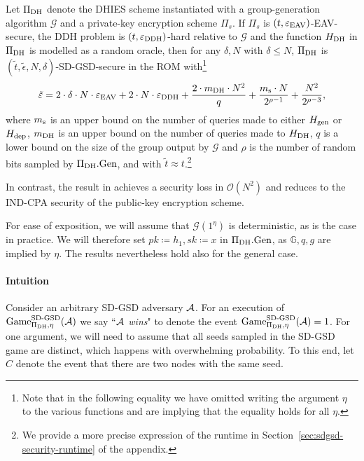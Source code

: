 \begin{theorem} \label{theorem:sdgsd-security}
	Let $\Pi_{\mathrm{DH}}$ denote the DHIES scheme instantiated with a group-generation algorithm $\mathcal{G}$ and a private-key encryption scheme $\Pi_s$. If $\Pi_s$ is $(t, \varepsilon_\mathrm{EAV})$-EAV-secure, the DDH problem is $(t, \varepsilon_\mathrm{DDH})$-hard relative to $\mathcal{G}$ and the function $H_\mathrm{DH}$ in $\Pi_{\mathrm{DH}}$ is modelled as a random oracle, then for any $\delta, N$ with $\delta \le N$, $\Pi_{\mathrm{DH}}$ is $(\tilde{t}, \tilde{\epsilon}, N, \delta)$-SD-GSD-secure in the ROM with\footnote{Note that in the following equality we have omitted writing the argument $\eta$ to the various functions and are implying that the equality holds for all $\eta$.}
	\[
		\tilde{\varepsilon} = 2 \cdot \delta \cdot N \cdot \varepsilon_\mathrm{EAV} + 2 \cdot N \cdot \varepsilon_\mathrm{DDH} + \frac{2 \cdot m_\mathrm{DH} \cdot N^2}{q} + \frac{m_\mathrm{s} \cdot N}{2^{\rho - 1}} + \frac{N^2}{2^{\rho - 3}},
	\]
	where $m_\mathrm{s}$ is an upper bound on the number of queries made to either $H_\mathrm{gen}$ or $H_\mathrm{dep}$, $m_\mathrm{DH}$ is an upper bound on the number of queries made to $H_\mathrm{DH}$, $q$ is a lower bound on the size of the group output by $\mathcal{G}$ and $\rho$ is the number of random bits sampled by $\Pi_{\mathrm{DH}}.\mathrm{Gen}$, and with $\tilde{t} \approx t$.\footnote{We provide a more precise expression of the runtime in Section~\ref{sec:sdgsd-security-runtime} of the appendix.}
\end{theorem}

In contrast, the result in \cite{ttkem} achieves a security loss in $\mathcal{O}(N^2)$ and reduces to the IND-CPA security of the public-key encryption scheme.

For ease of exposition, we will assume that $\mathcal{G}(1^\eta)$ is deterministic, as is the case in practice. We will therefore set $pk \coloneqq h_1, sk \coloneqq x$ in $\Pi_{\mathrm{DH}}.\mathrm{Gen}$, as $\mathbb{G}, q, g$ are implied by $\eta$. The results nevertheless hold also for the general case.

\paragraph{Intuition}
Consider an arbitrary SD-GSD adversary $\mathcal{A}$. For an execution of $\mathrm{Game}_{\Pi_{\mathrm{DH}}, \eta}^{\mathrm{SD\text{-}GSD}}(\mathcal{A})$ we say ``\emph{$\mathcal{A}$ wins}" to denote the event $\mathrm{Game}_{\Pi_{\mathrm{DH}}, \eta}^{\mathrm{SD\text{-}GSD}}(\mathcal{A}) = 1$. For one argument, we will need to assume that all seeds sampled in the SD-GSD game are distinct, which happens with overwhelming probability. To this end, let $C$ denote the event that there are two nodes with the same seed.

